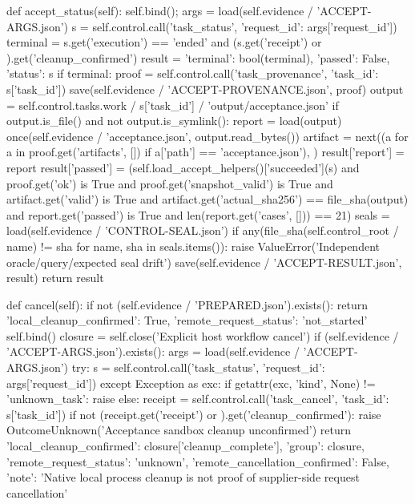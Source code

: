    def accept_status(self):
        self.bind(); args = load(self.evidence / 'ACCEPT-ARGS.json')
        s = self.control.call('task_status', {'request_id': args['request_id']})
        terminal = s.get('execution') == 'ended' and (s.get('receipt') or {}).get('cleanup_confirmed')
        result = {'terminal': bool(terminal), 'passed': False, 'status': s}
        if terminal:
            proof = self.control.call('task_provenance', {'task_id': s['task_id']})
            save(self.evidence / 'ACCEPT-PROVENANCE.json', proof)
            output = self.control.tasks.work / s['task_id'] / 'output/acceptance.json'
            if output.is_file() and not output.is_symlink():
                report = load(output)
                once(self.evidence / 'acceptance.json', output.read_bytes())
                artifact = next((a for a in proof.get('artifacts', []) if a['path'] == 'acceptance.json'), {})
                result['report'] = report
                result['passed'] = (self.load_accept_helpers()['succeeded'](s) and proof.get('ok') is True
                    and proof.get('snapshot_valid') is True and artifact.get('valid') is True
                    and artifact.get('actual_sha256') == file_sha(output) and report.get('passed') is True
                    and len(report.get('cases', [])) == 21)
            seals = load(self.evidence / 'CONTROL-SEAL.json')
            if any(file_sha(self.control_root / name) != sha for name, sha in seals.items()):
                raise ValueError('Independent oracle/query/expected seal drift')
        save(self.evidence / 'ACCEPT-RESULT.json', result)
        return result

    def cancel(self):
        if not (self.evidence / 'PREPARED.json').exists():
            return {'local_cleanup_confirmed': True, 'remote_request_status': 'not_started'}
        self.bind()
        closure = self.close('Explicit host workflow cancel')
        if (self.evidence / 'ACCEPT-ARGS.json').exists():
            args = load(self.evidence / 'ACCEPT-ARGS.json')
            try:
                s = self.control.call('task_status', {'request_id': args['request_id']})
            except Exception as exc:
                if getattr(exc, 'kind', None) != 'unknown_task':
                    raise
            else:
                receipt = self.control.call('task_cancel', {'task_id': s['task_id']})
                if not (receipt.get('receipt') or {}).get('cleanup_confirmed'):
                    raise OutcomeUnknown('Acceptance sandbox cleanup unconfirmed')
        return {'local_cleanup_confirmed': closure['cleanup_complete'], 'group': closure,
                'remote_request_status': 'unknown', 'remote_cancellation_confirmed': False,
                'note': 'Native local process cleanup is not proof of supplier-side request cancellation'}

